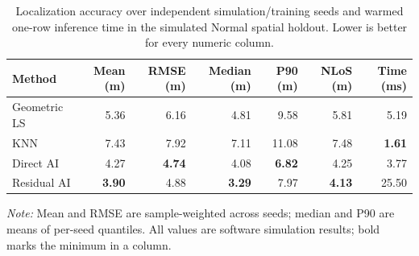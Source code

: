 \begin{table}[t]
\centering
\caption{Localization accuracy over independent simulation/training seeds and warmed one-row inference time in the simulated Normal spatial holdout. Lower is better for every numeric column.}
\label{tab:main_results}
\small
\begin{tabular}{lrrrrrr}
\toprule
Method & Mean (m) & RMSE (m) & Median (m) & P90 (m) & NLoS (m) & Time (ms) \\
\midrule
Geometric LS & 5.36 & 6.16 & 4.81 & 9.58 & 5.81 & 5.19 \\
KNN & 7.43 & 7.92 & 7.11 & 11.08 & 7.48 & \textbf{1.61} \\
Direct AI & 4.27 & \textbf{4.74} & 4.08 & \textbf{6.82} & 4.25 & 3.77 \\
Residual AI & \textbf{3.90} & 4.88 & \textbf{3.29} & 7.97 & \textbf{4.13} & 25.50 \\
\bottomrule
\end{tabular}
\par\smallskip\footnotesize\textit{Note:} Mean and RMSE are sample-weighted across seeds; median and P90 are means of per-seed quantiles. All values are software simulation results; bold marks the minimum in a column.
\end{table}
